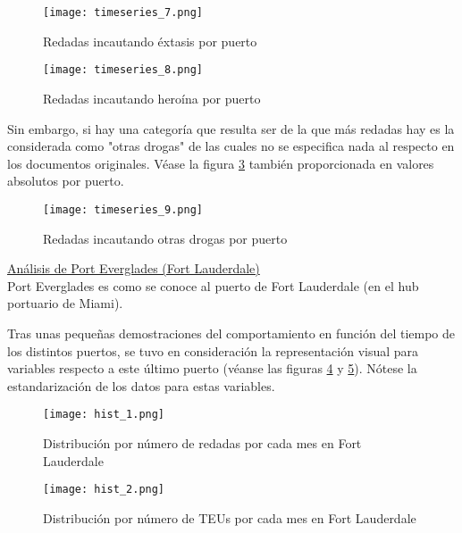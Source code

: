 \documentclass[12pt]{article}
\begin{document}
		\begin{figure}[H]
			\caption{\label{timeseries_7} Redadas incautando éxtasis por puerto}
			\centering
			\hspace*{1cm}
			\texttt{[image: timeseries\_7.png]}
		\end{figure}
	
		\begin{figure}[H]
			\caption{\label{timeseries_8} Redadas incautando heroína por puerto}
			\centering
			\hspace*{1cm}
			\texttt{[image: timeseries\_8.png]}
		\end{figure}
	
		Sin embargo, si hay una categoría que resulta ser de la que más redadas hay es la considerada como "otras drogas" de las cuales no se especifica nada al respecto en los documentos originales. Véase la figura \ref{timeseries_9} también proporcionada en valores absolutos por puerto.
		
		\begin{figure}[H]
			\caption{\label{timeseries_9} Redadas incautando otras drogas por puerto}
			\centering
			\hspace*{1cm}
			\texttt{[image: timeseries\_9.png]}
		\end{figure}
	
		\underline{Análisis de Port Everglades (Fort Lauderdale)}\\
		Port Everglades es como se conoce al puerto de Fort Lauderdale (en el hub portuario de Miami).
		
		Tras unas pequeñas demostraciones del comportamiento en función del tiempo de los distintos puertos, se tuvo en consideración la representación visual para variables respecto a este último puerto (véanse las figuras \ref{hist_1} y \ref{hist_2}). Nótese la estandarización de los datos para estas variables.
		
		\begin{figure}[H]
			\caption{\label{hist_1} Distribución por número de redadas por cada mes en Fort Lauderdale}
			\centering
			\hspace*{1cm}
			\texttt{[image: hist\_1.png]}
		\end{figure}
	
		\begin{figure}[H]
			\caption{\label{hist_2} Distribución por número de TEUs por cada mes en Fort Lauderdale}
			\centering
			\hspace*{1cm}
			\texttt{[image: hist\_2.png]}
		\end{figure}
	
\end{document}
